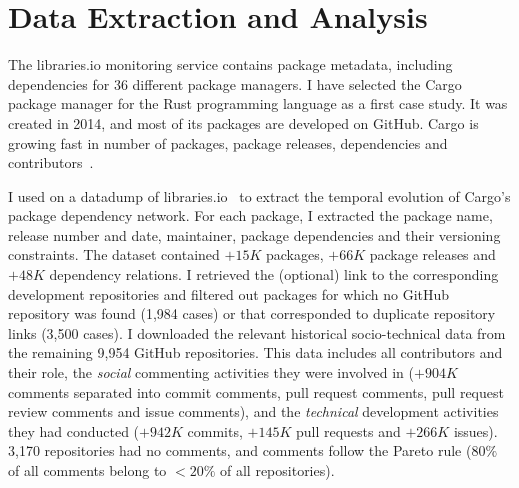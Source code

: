 \section{Data Extraction and Analysis} 

The \textsf{libraries.io} monitoring service contains package metadata, including dependencies for 36 different package managers.
I have selected the Cargo package manager for the Rust programming language as a first case study. It was created in 2014, and most of its packages are developed on GitHub. 
Cargo is growing fast in number of packages, package releases, dependencies and contributors~\cite{Decan2019EMSE}. 

I used on a datadump of \textsf{libraries.io}~\cite{Katz2018} to extract the temporal evolution of Cargo's package dependency network. 
For each package, I extracted %
 the package name, release number and date, maintainer, package dependencies and their versioning constraints. 
The dataset contained $+15K$ packages, $+66K$ package releases and $+48K$ dependency relations.
I retrieved the (optional) link to the corresponding development repositories and filtered out packages for which no GitHub repository was found (1,984 cases) %
or that corresponded to duplicate repository links (3,500 cases).
I downloaded the relevant historical socio-technical data from the remaining 9,954 GitHub repositories.
This data includes all contributors and their role, the \emph{social} commenting activities they were involved in ($+904K$ comments separated into commit comments, pull request comments, pull request review comments and issue comments), and the \emph{technical} development activities they had conducted ($+942K$ commits, $+145K$ pull requests and $+266K$ issues).
3,170 repositories had no comments, and comments follow the Pareto rule ($80\%$ of all comments belong to $<20\%$ of all repositories).